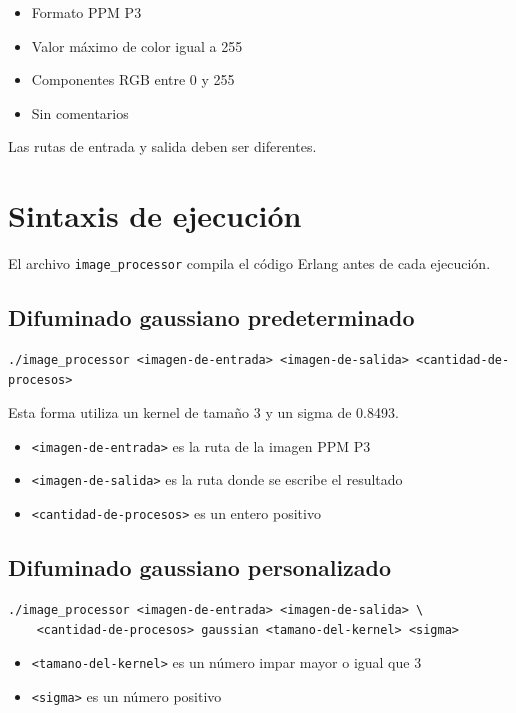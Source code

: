 \documentclass[11pt]{article}
\begin{document}
\begin{itemize}
    \item Formato PPM P3
    \item Valor máximo de color igual a 255
    \item Componentes RGB entre 0 y 255
    \item Sin comentarios
\end{itemize}

Las rutas de entrada y salida deben ser diferentes.

\section*{Sintaxis de ejecución}

El archivo \texttt{image\_processor} compila el código Erlang antes de cada
ejecución.

\subsection*{Difuminado gaussiano predeterminado}

\begin{lstlisting}
./image_processor <imagen-de-entrada> <imagen-de-salida> <cantidad-de-procesos>
\end{lstlisting}

Esta forma utiliza un kernel de tamaño 3 y un sigma de 0.8493.

\begin{itemize}
    \item \verb|<imagen-de-entrada>| es la ruta de la imagen PPM P3
    \item \verb|<imagen-de-salida>| es la ruta donde se escribe el resultado
    \item \verb|<cantidad-de-procesos>| es un entero positivo
\end{itemize}

\subsection*{Difuminado gaussiano personalizado}

\begin{lstlisting}
./image_processor <imagen-de-entrada> <imagen-de-salida> \
    <cantidad-de-procesos> gaussian <tamano-del-kernel> <sigma>
\end{lstlisting}

\begin{itemize}
    \item \verb|<tamano-del-kernel>| es un número impar mayor o igual que 3
    \item \verb|<sigma>| es un número positivo
\end{itemize}
\end{document}
